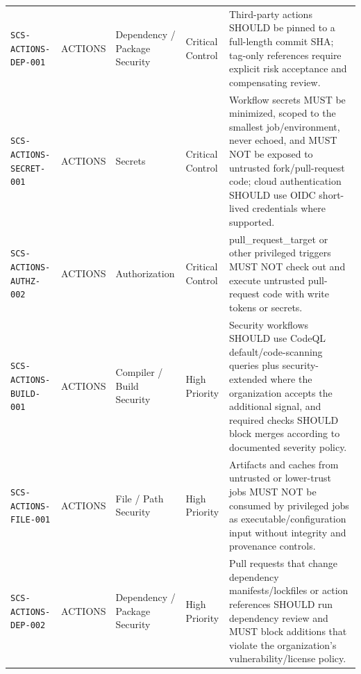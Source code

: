 \documentclass[10pt,letterpaper]{article}
\newcommand{\code}[1]{\begingroup\small\ttfamily\def\UrlFont{\ttfamily}\nolinkurl{#1}\endgroup}
\begin{document}
\begin{landscape}
\begin{longtable}{@{}P{1.3in}P{0.8in}P{1.45in}P{1.0in}P{4.65in}@{}}
\code{SCS-ACTIONS-DEP-001} & ACTIONS & Dependency / Package Security & Critical Control & Third-party actions SHOULD be pinned to a full-length commit SHA; tag-only references require explicit risk acceptance and compensating review.\\
\code{SCS-ACTIONS-SECRET-001} & ACTIONS & Secrets & Critical Control & Workflow secrets MUST be minimized, scoped to the smallest job/environment, never echoed, and MUST NOT be exposed to untrusted fork/pull-request code; cloud authentication SHOULD use OIDC short-lived credentials where supported.\\
\code{SCS-ACTIONS-AUTHZ-002} & ACTIONS & Authorization & Critical Control & pull\_request\_target or other privileged triggers MUST NOT check out and execute untrusted pull-request code with write tokens or secrets.\\
\code{SCS-ACTIONS-BUILD-001} & ACTIONS & Compiler / Build Security & High Priority & Security workflows SHOULD use CodeQL default/code-scanning queries plus security-extended where the organization accepts the additional signal, and required checks SHOULD block merges according to documented severity policy.\\
\code{SCS-ACTIONS-FILE-001} & ACTIONS & File / Path Security & High Priority & Artifacts and caches from untrusted or lower-trust jobs MUST NOT be consumed by privileged jobs as executable/configuration input without integrity and provenance controls.\\
\code{SCS-ACTIONS-DEP-002} & ACTIONS & Dependency / Package Security & High Priority & Pull requests that change dependency manifests/lockfiles or action references SHOULD run dependency review and MUST block additions that violate the organization's vulnerability/license policy.\\
\bottomrule
\end{longtable}
\normalsize
\end{landscape}
\end{document}

